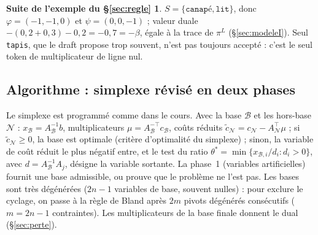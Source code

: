 \documentclass[11pt,a4paper]{article}
\newcommand{\cB}{\mathcal{B}}
\newcommand{\cN}{\mathcal{N}}
\newcommand{\tok}[1]{\texttt{#1}}
\theoremstyle{plain}
\theoremstyle{definition}
\newtheorem*{suite}{Suite de l'exemple du §\ref{sec:regle}}
\begin{document}
\begin{suite}
$S=\{\tok{canapé},\tok{lit}\}$, donc $\varphi=(-1,-1,0)$ et $\psi=(0,0,-1)$ ; valeur duale $-(0{,}2+0{,}3)-0{,}2=-0{,}7=-\beta$, égale à la trace de $\pi^L$ (§\ref{sec:modeleI}). Seul \tok{tapis}, que le draft propose trop souvent, n'est pas toujours accepté : c'est le seul token de multiplicateur de ligne nul.
\end{suite}

\subsection{Algorithme : simplexe révisé en deux phases}\label{sec:simplexe}
Le simplexe est programmé comme dans le cours. Avec la base $\cB$ et les hors-base $\cN$ : $x_\cB=A_\cB^{-1}b$, multiplicateurs $\mu=A_\cB^{-\top}c_\cB$, coûts réduits $\tilde c_\cN=c_\cN-A_\cN^\top\mu$ ; si $\tilde c_\cN\ge0$, la base est optimale (critère d'optimalité du simplexe) ; sinon, la variable de coût réduit le plus négatif entre, et le test du ratio $\theta^*=\min\{x_{\cB,i}/d_i:d_i>0\}$, avec $d=A_\cB^{-1}A_j$, désigne la variable sortante. La phase~1 (variables artificielles) fournit une base admissible, ou prouve que le problème ne l'est pas. Les bases sont très dégénérées ($2n-1$ variables de base, souvent nulles) : pour exclure le cyclage, on passe à la règle de Bland après $2m$ pivots dégénérés consécutifs ($m=2n-1$ contraintes). Les multiplicateurs de la base finale donnent le dual (§\ref{sec:perte}).
\end{document}
